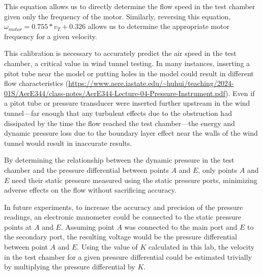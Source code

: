 This equation allows us to directly determine the flow speed in the test chamber given only the frequency of the motor. Similarly, reversing this equation, 
$\omega_{motor} = 0.755 * v_T + 0.326$ allows us to determine the appropriate motor frequency for a given velocity. \par
This calibration is necessary to accurately predict the air speed in the test chamber, a critical value in wind tunnel testing. In many instances, inserting a pitot tube near the model or putting holes in the model could result in different flow characteristics (\url{https://www.aere.iastate.edu/~huhui/teaching/2024-01S/AerE344/class-notes/AerE344-Lecture-04-Pressure-Instrument.pdf}). Even if a pitot tube or pressure transducer were inserted further upstream in the wind tunnel—far enough that any turbulent effects due to the obstruction had dissipated by the time the flow reached the test chamber—the energy and dynamic pressure loss due to the boundary layer effect near the walls of the wind tunnel would result in inaccurate results. \par
By determining the relationship between the dynamic pressure in the test chamber and the pressure differential between points $A$ and $E$, only points $A$ and $E$ need their static pressure measured using the static pressure ports, minimizing adverse effects on the flow without sacrificing accuracy. \par
In future experiments, to increase the accuracy and precision of the pressure readings, an electronic manometer could be connected to the static pressure points at $A$ and $E$. Assuming point $A$ was connected to the main port and $E$ to the secondary port, the resulting voltage would be the pressure differential between point $A$ and $E$. Using the value of $K$ calculated in this lab, the velocity in the test chamber for a given pressure differential could be estimated trivially by multiplying the pressure differential by $K$. 